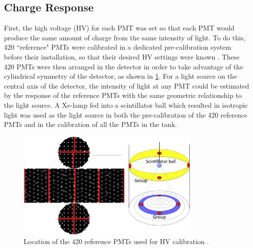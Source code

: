 \subsection{Charge Response}
First, the high voltage (HV) for each PMT was set so that each PMT would produce the same amount of charge from the same intensity of light.  To do this, 420 ``reference" PMTs were calibrated in a dedicated pre-calibration system before their installation, so that their desired HV settings were known \cite{Abe:2013gga}.  These 420 PMTs were then arranged in the detector in order to take advantage of the cylindrical symmetry of the detector, as shown in \cref{fig:reference_pmts}.  For a light source on the central axis of the detector, the intensity of light at any PMT could be estimated by the response of the reference PMTs with the same geometric relationship to the light source.  A Xe-lamp fed into a scintillator ball which resulted in isotropic light was used as the light source in both the pre-calibration of the 420 reference PMTs and in the calibration of all the PMTs in the tank. \par
\begin{figure}
\centering
\includegraphics[width=0.8\textwidth,keepaspectratio]{figures/reference_pmts.png}
\caption{Location of the 420 reference PMTs used for HV calibration \cite{Abe:2013gga}.}
\label{fig:reference_pmts}	
\end{figure}  

